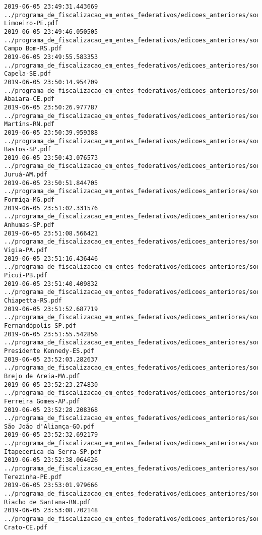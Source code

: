 \begin{lstlisting}
2019-06-05 23:49:31.443669 ../programa_de_fiscalizacao_em_entes_federativos/edicoes_anteriores/sorteio_38/3018-Limoeiro-PE.pdf
2019-06-05 23:49:46.050505 ../programa_de_fiscalizacao_em_entes_federativos/edicoes_anteriores/sorteio_38/3042-Campo Bom-RS.pdf
2019-06-05 23:49:55.583353 ../programa_de_fiscalizacao_em_entes_federativos/edicoes_anteriores/sorteio_38/3056-Capela-SE.pdf
2019-06-05 23:50:14.954709 ../programa_de_fiscalizacao_em_entes_federativos/edicoes_anteriores/sorteio_38/2967-Abaiara-CE.pdf
2019-06-05 23:50:26.977787 ../programa_de_fiscalizacao_em_entes_federativos/edicoes_anteriores/sorteio_38/3036-Martins-RN.pdf
2019-06-05 23:50:39.959388 ../programa_de_fiscalizacao_em_entes_federativos/edicoes_anteriores/sorteio_38/3060-Bastos-SP.pdf
2019-06-05 23:50:43.076573 ../programa_de_fiscalizacao_em_entes_federativos/edicoes_anteriores/sorteio_38/2953-Juruá-AM.pdf
2019-06-05 23:50:51.844705 ../programa_de_fiscalizacao_em_entes_federativos/edicoes_anteriores/sorteio_38/2987-Formiga-MG.pdf
2019-06-05 23:51:02.331576 ../programa_de_fiscalizacao_em_entes_federativos/edicoes_anteriores/sorteio_38/3058-Anhumas-SP.pdf
2019-06-05 23:51:08.566421 ../programa_de_fiscalizacao_em_entes_federativos/edicoes_anteriores/sorteio_38/3012-Vigia-PA.pdf
2019-06-05 23:51:16.436446 ../programa_de_fiscalizacao_em_entes_federativos/edicoes_anteriores/sorteio_38/3016-Picuí-PB.pdf
2019-06-05 23:51:40.409832 ../programa_de_fiscalizacao_em_entes_federativos/edicoes_anteriores/sorteio_38/3044-Chiapetta-RS.pdf
2019-06-05 23:51:52.687719 ../programa_de_fiscalizacao_em_entes_federativos/edicoes_anteriores/sorteio_38/3062-Fernandópolis-SP.pdf
2019-06-05 23:51:55.542856 ../programa_de_fiscalizacao_em_entes_federativos/edicoes_anteriores/sorteio_38/2975-Presidente Kennedy-ES.pdf
2019-06-05 23:52:03.282637 ../programa_de_fiscalizacao_em_entes_federativos/edicoes_anteriores/sorteio_38/2983-Brejo de Areia-MA.pdf
2019-06-05 23:52:23.274830 ../programa_de_fiscalizacao_em_entes_federativos/edicoes_anteriores/sorteio_38/2955-Ferreira Gomes-AP.pdf
2019-06-05 23:52:28.208368 ../programa_de_fiscalizacao_em_entes_federativos/edicoes_anteriores/sorteio_38/2981-São João d'Aliança-GO.pdf
2019-06-05 23:52:32.692179 ../programa_de_fiscalizacao_em_entes_federativos/edicoes_anteriores/sorteio_38/3064-Itapecerica da Serra-SP.pdf
2019-06-05 23:52:38.064626 ../programa_de_fiscalizacao_em_entes_federativos/edicoes_anteriores/sorteio_38/3022-Terezinha-PE.pdf
2019-06-05 23:53:01.979666 ../programa_de_fiscalizacao_em_entes_federativos/edicoes_anteriores/sorteio_38/3040-Riacho de Santana-RN.pdf
2019-06-05 23:53:08.702148 ../programa_de_fiscalizacao_em_entes_federativos/edicoes_anteriores/sorteio_38/2971-Crato-CE.pdf

\end{lstlisting}
